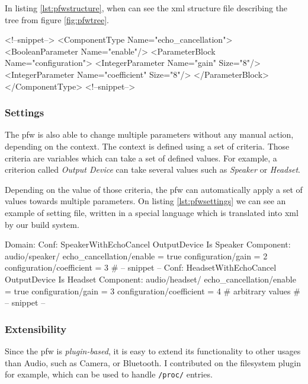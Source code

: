 In listing \ref{lst:pfwstructure}, when can see the \gls{xml} structure file
describing the tree from figure \ref{fig:pfwtree}.

\begin{code}[language=pfwXml, caption=Structure file example snippet, label=lst:pfwstructure]
<!--snippet-->
<ComponentType Name="echo_cancellation">
    <BooleanParameter Name="enable"/>
    <ParameterBlock Name="configuration">
        <IntegerParameter Name="gain" Size="8"/>
        <IntegerParameter Name="coefficient" Size="8"/>
    </ParameterBlock>
</ComponentType>
<!--snippet-->
\end{code}

\subsubsection{Settings}
The \gls{pfw} is also able to change multiple parameters without any manual action, depending on the context.
The context is defined using a set of criteria. Those criteria are variables which can take a set of defined values.
For example, a criterion called \emph{Output Device} can take several values such as \emph{Speaker} or \emph{Headset}.

Depending on the value of those criteria, the \gls{pfw} can automatically apply a set of values towards
multiple parameters.
On listing \ref{lst:pfwsettings} we can see an example of setting file, written in a special language
which is translated into \gls{xml} by our build system.

\begin{code}[language=pfwLang, caption=Settings file example, label=lst:pfwsettings]
Domain:
    Conf: SpeakerWithEchoCancel
        OutputDevice Is Speaker
        Component: audio/speaker/
            echo_cancellation/enable = true
            configuration/gain = 2
            configuration/coefficient = 3
        # -- snippet --
    Conf: HeadsetWithEchoCancel
        OutputDevice Is Headset
        Component: audio/headset/
            echo_cancellation/enable = true
            configuration/gain = 3
            configuration/coefficient = 4 # arbitrary values
        # -- snippet --
\end{code}

\subsubsection{Extensibility}
Since the \gls{pfw} is \emph{plugin-based}, it is easy to extend its functionality to other usages than Audio, such
as Camera, or Bluetooth. I contributed on the filesystem plugin for example, which can be used to handle \lstinline{/proc/} entries.
